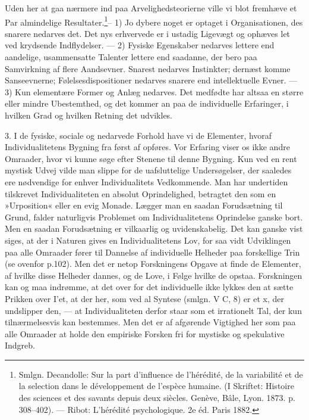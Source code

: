 \documentclass[12pt,a4paper,openany]{book}
\newcommand{\opage}[1]{\marginnote{\footnotesize\textit{[#1]}}}
\begin{document}
Uden her at gaa nærmere ind paa Arvelighedsteorierne ville vi blot
fremhæve et Par almindelige Resultater.\footnote[1]{Smlgn. Decandolle:
Sur la part d’influence de l’hérédité, de la variabilité et de la
selection dans le développement de l’espèce humaine. (I Skriftet:
Histoire des sciences et des savants depuis deux siècles. Genève, Bâle,
Lyon. 1873. p. 308--402). --- Ribot: L’hérédité psychologique. 2e éd.
Paris 1882.}-- 1) Jo dybere noget er optaget i Organisationen, des
snarere nedarves det. Det nys erhvervede er i ustadig Ligevægt og
ophæves let ved krydsende Indflydelser. --- 2) Fysiske Egenskaber
nedarves lettere end aandelige, usammensatte Talenter lettere end
saadanne, der bero paa Samvirkning af flere Aandsevner. Snarest nedarves
Instinkter; dernæst komme Sanseevnerne; Følelsesdispositioner nedarves
snarere end intellektuelle Evner. --- 3) Kun elementære Former og Anlæg
nedarves. Det medfødte har altsaa en større eller mindre Ubestemthed, og
det kommer an paa de individuelle Erfaringer, i hvilken Grad og hvilken
Retning det udvikles.

3. I de fysiske, sociale og nedarvede Forhold have vi de Elementer,
hvoraf Individualitetens Bygning fra først af opføres. Vor Erfaring
viser os ikke andre Omraader, hvor vi kunne søge efter Stenene til denne
Bygning. Kun ved en rent mystisk Udvej vilde man slippe for de
uafsluttelige Undersøgelser, der saaledes ere nødvendige for enhver
Individualitets Vedkommende. Man har undertiden tilskrevet
Individualiteten en absolut Oprindelighed, betragtet den som en
»Urposition« eller en evig Monade. Lægger man en saadan Forudsætning til
Grund, falder naturligvis Problemet om Individualitetens Oprindelse
ganske bort. Men en saadan Forudsætning er vilkaarlig og uvidenskabelig.
Det kan ganske vist siges, at der i Naturen gives en Individualitetens
Lov, for saa vidt Udviklingen paa alle Omraader fører til Dannelse af
individuelle Helheder paa forskellige Trin (se ovenfor p.102). Men det
er netop Forskningens Opgave at finde de Elementer,
\opage{410}af hvilke disse Helheder dannes, og de Love, i Følge hvilke
de opstaa. Forskningen kan og maa indrømme, at det over for det
individuelle ikke lykkes den at sætte Prikken over I’et, at der her, som
ved al Syntese (smlgn. V C, 8) er et x, der undslipper den, --- at
Individualiteten derfor staar som et irrationelt Tal, der kun
tilnærmelsesvis kan bestemmes. Men det er af afgørende Vigtighed her som
paa alle Omraader at holde den empiriske Forsken fri for mystiske og
spekulative Indgreb.
\end{document}
